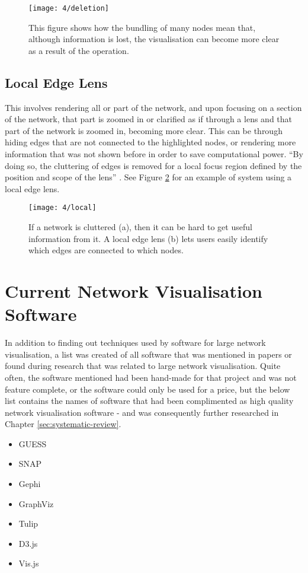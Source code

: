 \documentclass[../dissertation.tex]{subfiles}
\begin{document}
\begin{figure}[htb]
    \centering
    \texttt{[image: 4/deletion]}
    \caption{This figure shows how the bundling of many nodes mean that, although information is lost, the visualisation can become more clear as a result of the operation. \cite{hu2015visualizing}}
    \label{fig:deletion}
\end{figure}

\subsection{Local Edge Lens}

This involves rendering all or part of the network, and upon focusing on a section of the network, that part is zoomed in or clarified as if through a lens and that part of the network is zoomed in, becoming more clear. This can be through hiding edges that are not connected to the highlighted nodes, or rendering more information that was not shown before in order to save computational power. ``By doing so, the cluttering of edges is removed for a local focus region defined by the position and scope of the lens'' \cite{tominski2006fisheye}. See Figure \ref{fig:local} for an example of system using a local edge lens.
\begin{figure}[htb]
    \centering
    \texttt{[image: 4/local]}
    \caption{If a network is cluttered (a), then it can be hard to get useful information from it. A local edge lens (b) lets users easily identify which edges are connected to which nodes. \cite{tominski2006fisheye}}
    \label{fig:local}
\end{figure}

\section{Current Network Visualisation Software}

In addition to finding out techniques used by software for large network visualisation, a list was created of all software that was mentioned in papers or found during research that was related to large network visualisation. Quite often, the software mentioned had been hand-made for that project and was not feature complete, or the software could only be used for a price, but the below list contains the names of software that had been complimented as high quality network visualisation software - and was consequently further researched in Chapter \ref{sec:systematic-review}.
\begin{itemize}
    \item GUESS \cite{guess}
    \item SNAP \cite{snap}
    \item Gephi \cite{gephi}
    \item GraphViz \cite{graphviz}
    \item Tulip \cite{tulip}
    \item D3.js \cite{d3}
    \item Vis.js \cite{vis}
\end{itemize}
\end{document}
